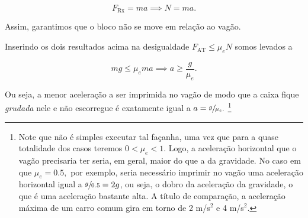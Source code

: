 \begin{exemplo}[Nível II]
\begin{enumerate}
    $$ F_{\text{Rx}} = ma \implies N = ma.$$

    Assim, garantimos que o bloco não se move em relação ao vagão.
\end{enumerate}

Inserindo os dois resultados acima na desigualdade $F_{\text{AT}} \leq \mu_e N$ somos levados a

 $$ mg \leq \mu_e ma \implies \boxed{a \geq \dfrac{g}{\mu_e} .}$$

 Ou seja, a menor aceleração a ser imprimida no vagão de modo que a caixa fique \textit{grudada} nele e não escorregue é exatamente igual a $a = \sfrac{g}{\mu_e.}$ \footnote{Note que não é simples executar tal façanha, uma vez que para a quase totalidade dos casos teremos $0 < \mu_e < 1$. Logo, a aceleração horizontal que o vagão precisaria ter seria, em geral, maior do que a da gravidade. No caso em que $\mu_e = 0.5,$ por exemplo, seria necessário imprimir no vagão uma aceleração horizontal igual a $\sfrac{g}{0.5} = 2g$, ou seja, o dobro da aceleração da gravidade, o que é uma aceleração bastante alta. A título de comparação, a aceleração máxima de um carro comum gira em torno de 2 m/s$^2$ e 4 m/s$^2$.}

\end{exemplo}


\vspace{0.3cm}

